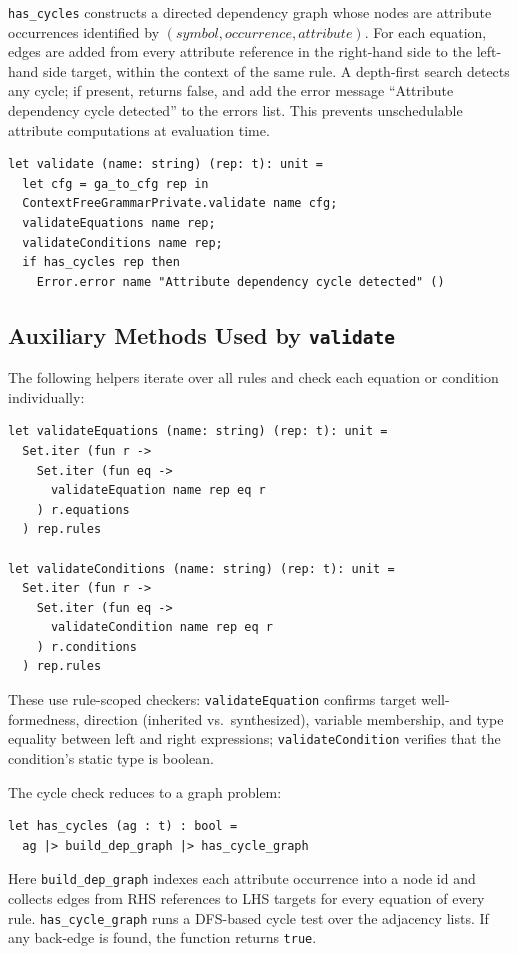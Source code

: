 \texttt{has\_cycles} constructs a directed dependency graph whose nodes are attribute occurrences identified by 
\((\textit{symbol}, \textit{occurrence}, \textit{attribute})\). For each equation, edges are added from every attribute reference in the right-hand side to 
the left-hand side target, within the context of the same rule. A depth-first search detects any cycle; if present, returns false, and add the error message 
\enquote{Attribute dependency cycle detected} to the errors list. This prevents unschedulable attribute computations at evaluation time. 

\begin{verbatim}
let validate (name: string) (rep: t): unit =
  let cfg = ga_to_cfg rep in
  ContextFreeGrammarPrivate.validate name cfg;
  validateEquations name rep;
  validateConditions name rep;
  if has_cycles rep then
    Error.error name "Attribute dependency cycle detected" ()
\end{verbatim}


\subsection{Auxiliary Methods Used by \texttt{validate}}

The following helpers iterate over all rules and check each equation or condition individually:

\begin{verbatim}
let validateEquations (name: string) (rep: t): unit =
  Set.iter (fun r ->
    Set.iter (fun eq ->
      validateEquation name rep eq r
    ) r.equations
  ) rep.rules

let validateConditions (name: string) (rep: t): unit =
  Set.iter (fun r ->
    Set.iter (fun eq ->
      validateCondition name rep eq r
    ) r.conditions
  ) rep.rules
\end{verbatim}
These use rule-scoped checkers: \texttt{validateEquation} confirms target well-formedness, direction (inherited vs.\ synthesized), variable membership, 
and type equality between left and right expressions; \texttt{validateCondition} verifies that the condition's static type is boolean. 


The cycle check reduces to a graph problem:
\begin{verbatim}
let has_cycles (ag : t) : bool =
  ag |> build_dep_graph |> has_cycle_graph
\end{verbatim}
Here \texttt{build\_dep\_graph} indexes each attribute occurrence into a node id and collects edges from RHS references to LHS targets for every equation 
of every rule. \texttt{has\_cycle\_graph} runs a DFS-based cycle test over the adjacency lists. If any back-edge is found, the function returns \texttt{true}. 


